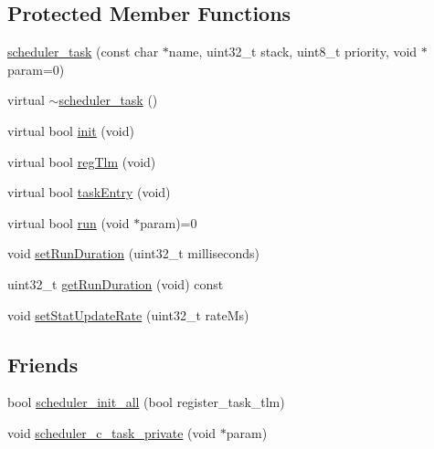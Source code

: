 \subsection*{Protected Member Functions}
\begin{DoxyCompactItemize}
\item 
\hyperlink{classscheduler__task_a7b06382316d8416fb02b516018f8f501}{scheduler\+\_\+task} (const char $\ast$name, uint32\+\_\+t stack, uint8\+\_\+t priority, void $\ast$param=0)
\item 
virtual \hyperlink{classscheduler__task_ab2a5d3602377fd7c44bebc110828309b}{$\sim$scheduler\+\_\+task} ()
\item 
virtual bool \hyperlink{classscheduler__task_ab72fdc17bcb76996bfd41387d604f982}{init} (void)
\item 
virtual bool \hyperlink{classscheduler__task_a45281a4c3bf7abdebcf379f4076573e5}{reg\+Tlm} (void)
\item 
virtual bool \hyperlink{classscheduler__task_a2a0499b206a36efd9542b00eac8f2a14}{task\+Entry} (void)
\item 
virtual bool \hyperlink{classscheduler__task_a17e9027d2a79dded027a8d0737ab0e77}{run} (void $\ast$param)=0
\item 
void \hyperlink{classscheduler__task_aefca576927c9b6abc35d023b74d05b4c}{set\+Run\+Duration} (uint32\+\_\+t milliseconds)
\item 
uint32\+\_\+t \hyperlink{classscheduler__task_a4d5f6079edce5220a22e70326cd7133c}{get\+Run\+Duration} (void) const 
\item 
void \hyperlink{classscheduler__task_acd5a2ed7fd6de9a07e015fcc84e0c91e}{set\+Stat\+Update\+Rate} (uint32\+\_\+t rate\+Ms)
\end{DoxyCompactItemize}
\subsection*{Friends}
{\bf }\par
\begin{DoxyCompactItemize}
\item 
bool \hyperlink{classscheduler__task_a08bec36d294f3e92bb1139c2462d946d}{scheduler\+\_\+init\+\_\+all} (bool register\+\_\+task\+\_\+tlm)
\item 
void \hyperlink{classscheduler__task_a0278f7dfe86285c571a5abcf071f0e93}{scheduler\+\_\+c\+\_\+task\+\_\+private} (void $\ast$param)
\end{DoxyCompactItemize}

